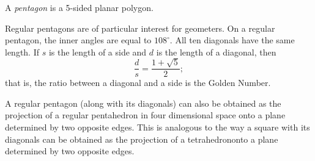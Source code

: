 \documentclass{article}
\begin{document}
A \emph{pentagon} is a 5-sided planar polygon.

Regular pentagons are of particular interest for geometers.
On a regular pentagon, the inner angles are equal to $108^\circ$.
All ten diagonals have the same length. If $s$ is the length of a side and $d$ is the length of a diagonal, then 
$$\frac{d}{s}=\frac{1+\sqrt{5}}{2};$$
that is, the ratio between a diagonal and a side is the Golden Number.

A regular pentagon (along with its diagonals) can also be obtained as
the projection of a regular pentahedron in four dimensional space
onto a plane determined by two opposite edges.
This is analogous to the way a square with its diagonals can be obtained 
as the projection of a tetrahedrononto a plane determined by two opposite edges.
\end{document}
